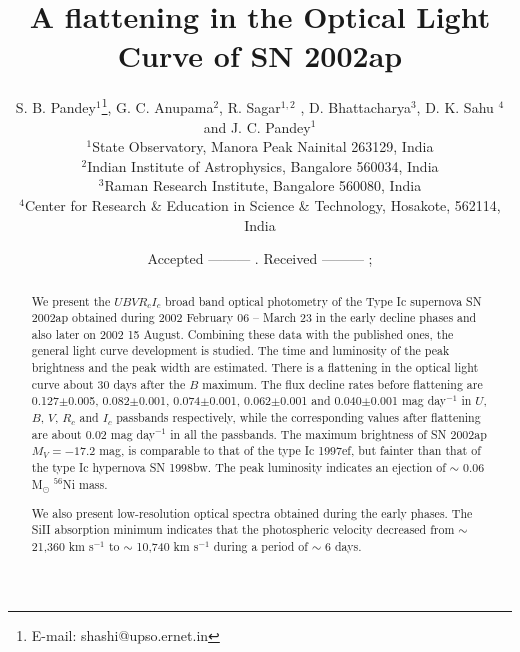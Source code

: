 \ifCUPmtlplainloaded \else
  \ifAMStwofonts \else %
    \def\upi{\pi}
    \def\umu{\mu}
    \def\upartial{\partial}
  \fi
\fi


\title{A flattening in the Optical Light Curve of SN 2002ap}
\author[S. B. Pandey et al.]
      {S. B. Pandey$^{1}$\thanks{E-mail: shashi@upso.ernet.in}, G. C. Anupama$^2$, R. Sagar$^{1,2}$
, D. Bhattacharya$^{3}$, 
\newauthor D. K. Sahu $^{4}$ and J. C. Pandey$^{1}$ \\
        $^{1}$State Observatory, Manora Peak Nainital 263129, India\\
        $^{2}$Indian Institute of Astrophysics, Bangalore 560034, India\\
        $^{3}$Raman Research Institute, Bangalore 560080, India\\     
        $^{4}$Center for Research \& Education in Science \& Technology, Hosakote, 562114, India}
\date{Accepted --------- .
      Received --------- ;
                         }

\pagerange{\pageref{firstpage}--\pageref{lastpage}}



\maketitle

\label{firstpage}

\begin{abstract}
We present the $UBVR_cI_c$ broad band optical photometry of the Type Ic 
supernova SN 2002ap obtained during 2002 February 06 -- March 23
in the early decline phases and also later on 2002 15 August. Combining these 
data with the published ones, the general light curve development is studied. 
The time and luminosity of the peak brightness and the 
peak width are estimated. There is a flattening in the optical light
curve about 30 days after the $B$ maximum.
The flux decline rates before flattening are 0.127$\pm$0.005,
0.082$\pm$0.001, 0.074$\pm$0.001, 0.062$\pm$0.001 and 0.040$\pm$0.001
mag day$^{-1}$ in $U$, $B$, $V$, $R_c$ and $I_c$ passbands respectively, while 
the corresponding values after flattening are about 0.02 mag day$^{-1}$ in all 
the passbands. The maximum brightness of SN 2002ap $M_V = - 17.2$ mag, is comparable 
to that of the type Ic 1997ef, but fainter than that of the type Ic hypernova SN 1998bw. 
 The peak luminosity indicates an ejection of $\sim$ 0.06 M$_{\odot}$ ${}^{56}$Ni mass.

We also present low-resolution optical spectra obtained during the early phases. 
 The SiII absorption minimum indicates that the photospheric velocity decreased from $\sim$
 21,360 km s$^{-1}$ to $\sim$ 10,740 km s$^{-1}$ during a period of $\sim$ 6 days.

\end{abstract}

